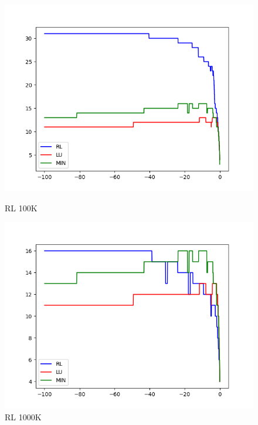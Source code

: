 \documentclass[]{article}
\begin{document}
\begin{figure}[h]
	\begin{minipage}[b]{.6\linewidth} %
		\includegraphics[width=\linewidth]{M_3_res_10_Lneg_100K_model_PPO2_v0.png}
		\caption{RL 100K}
	\end{minipage}
	\begin{minipage}[b]{.6\linewidth} %
		\includegraphics[width=\linewidth]{M_3_res_10_Lneg_1000K_model_PPO2_v0.png}
		\caption{RL 1000K}
	\end{minipage}
\end{figure}
\end{document}
